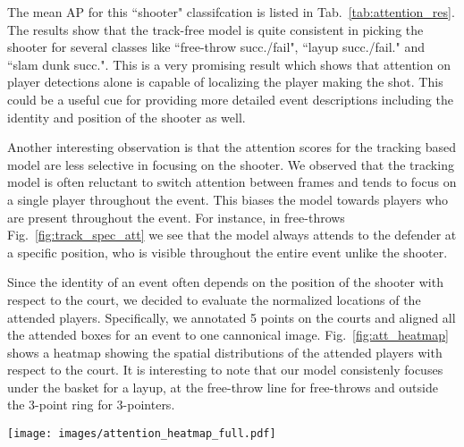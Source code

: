 The mean AP for this ``shooter"  classifcation is listed
in Tab.~\ref{tab:attention_res}.
The results show that the track-free model is quite consistent in picking
the shooter for several classes like ``free-throw succ./fail",
``layup succ./fail." and ``slam dunk succ.". This is a very
promising result which shows that attention on player detections
alone is capable of localizing the player making the shot. This could be
a useful cue for providing more detailed event descriptions
including the identity and position of the shooter as well.

Another interesting observation
is that the
attention scores for the tracking based model are less selective in focusing on
the shooter.  We observed that the tracking model is often reluctant to switch
attention between frames and tends to focus on a single player throughout the
event. This biases the model towards players who are present throughout the
event. For instance, in free-throws Fig.~\ref{fig:track_spec_att} we see that
the model always attends to the defender at a specific position, who is visible
throughout the entire event unlike the shooter.

Since the identity of an event often depends on the position of the
shooter with respect to the court, we decided to evaluate the
normalized locations of the attended players.
Specifically, we annotated 5 points on the courts and
aligned all the attended boxes for an event to one cannonical image. 
Fig.~\ref{fig:att_heatmap} shows a heatmap  showing the spatial distributions
of the attended players with respect to the court. It is interesting to note that
our model consistenly focuses under the basket for a layup, at the free-throw
line for free-throws and outside the 3-point ring for 3-pointers.



\begin{figure*}[t!]
\begin{center}
  \texttt{[image: images/attention\_heatmap\_full.pdf]}
\end{center}
   \caption{We show the distribution of the attention over the basketball court
     for different events. We used an affine transform to transform the
     attended player's position to a cannonical frame for visualization.
     Interestingly, the attended court positions are the typical spots from
     which a player would make a shot for the corresponding event.
   }
\label{fig:att_heatmap}
\end{figure*}


